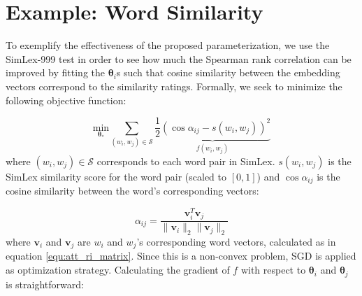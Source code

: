\documentclass[11pt]{article}
\begin{document}
\section{Example: Word Similarity} \label{cha:simlex_test}

To exemplify the effectiveness of the proposed parameterization, we use the SimLex-999 \cite{Hill:2015} 
test
in order to see how much the Spearman rank correlation can be improved by fitting the $\boldsymbol\theta_i$s such that cosine similarity between the embedding vectors correspond to the similarity ratings.
%
%
%
Formally, we seek to minimize the following objective function:

\begin{equation}
    \underset{\boldsymbol\theta_*}{\text{min}}
    \displaystyle\sum_{(w_i,w_j) \in \mathcal{S}} \underbrace{\frac{1}{2}\left(\cos{\alpha_{ij}} - s(w_i,w_j)\right)^2}_{f(w_i, w_j)}
\end{equation}
where $(w_i,w_j) \in \mathcal{S}$ corresponds to each word pair in SimLex. $s(w_i,w_j)$ is the SimLex similarity score for the word pair (scaled to $[0,1]$) and $\cos{\alpha_{ij}}$ is the cosine similarity between the word's corresponding vectors:

\begin{equation}{\alpha_{ij}} = \frac{\textbf{v}_i^T\textbf{v}_j}{\|\textbf{v}_i\|_2 \|\textbf{v}_j\|_2}
\end{equation}
where $\textbf{v}_i$ and $\textbf{v}_j$ are $w_i$ and $w_j$'s corresponding word vectors, calculated as in equation \eqref{equ:att_ri_matrix}. Since this is a non-convex problem, SGD is applied as optimization strategy. Calculating the gradient of $f$ with respect to $\boldsymbol\theta_i$ and $\boldsymbol\theta_j$ is straightforward:
\end{document}
